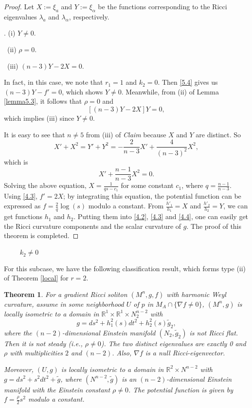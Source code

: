 \documentclass{amsart}
\newtheorem{theorem}{Theorem}[section]
\theoremstyle{definition}
\theoremstyle{remark}
\numberwithin{equation}{section}
\begin{document}
\begin{proof} 
	Let $X:=\xi_a$ and $Y:=\xi_\alpha$ be the functions corresponding to the Ricci eigenvalues 
	$\lambda_a$ and $\lambda_\alpha$, respectively.
	
.
	{\rm (i)} $Y\neq0$.
	
	\smallskip
\quad\quad \ {\rm (ii)} $\rho=0$.
	
	\smallskip
\quad\quad \ {\rm (iii)} $(n-3)Y-2X=0$. 
	
	In fact, in this case, we note that $r_1=1$ and $k_2=0$. Then \eqref {5.4} gives us
	$(n-3)Y-f'=0$, which shows $Y\neq0$.
Meanwhile, from (ii) of Lemma \ref{lemma5.3}, it follows that
	$\rho=0$ and 
\[
	[(n-3)Y-2X]Y= 0,
\]
	which implies (iii) since  $Y\neq0$.

	It is easy to see that $n\neq5$ from (iii) of {\it Claim} because $X$ and $Y$ are distinct.
	So
	\[
	X'+X^2=Y'+Y^2= -\frac{2}{n-3}X' +\frac{4}{(n-3)^2}X^2,
	\]
	which is 
	\[
	X'+\frac{n-1}{n-3}X^2=0. 
	\]
	Solving the above equation, 
	$X=\frac{1}{qs-c_1}$ for some constant $c_1$, where $q=\frac{n-1}{n-3}$.
	Using \eqref{4.3}, $f'=2X$; by integrating this equation,
	the potential function can be expressed as $f=\frac{2}{q} \log (s)$ modulo a constant.
	From $\frac{h'_1}{h_1}=X$ and $\frac{h'_2}{h_2}=Y$, we can get functions $h_1$ and $h_2$.
	Putting them into \eqref{4.2}, \eqref{4.3} and \eqref{4.4}, one can easily get the Ricci curvature components and the scalar curvature of $g$.  
	The proof of this theorem is completed. 	
\end{proof}


  ~~~~ $k_2\neq0$ 

For this subcase, we have the following classification result,
which forms type {\rm (ii)} of Theorem \ref{local} for $r=2$.
	
\begin{theorem} \label{twoone2}
		For a gradient Ricci soliton $\left(M^n, g, f \right) $ with harmonic Weyl curvature,
	assume in some neighborhood $U$ of $p$ in $M_A \cap \{ \nabla f \neq 0  \}$, 
	$(M^n,g)$ is locally isometric to a domain in 
	$\mathbb{R}^{1}\times \mathbb{R}^{1} \times N^{n-2}_2$
	with
	\[
	g= ds^2 + h^2_1(s)dt^2+h^2_2(s) \tilde{g}_{2}, 
	\]
	where the $(n-2)$-dimensional Einstein manifold $(N_2, \tilde{g}_{2})$ is not Ricci flat.
	Then it is not steady (i.e., $\rho\neq0$).  The two distinct eigenvalues are exactly  0 and $\rho$
	with multiplicities $2$ and $(n-2)$. Also, $\nabla f$ is a null Ricci-eigenvector.
	
	Moreover, $(U,g)$ is locally isometric to a domain in 
	$\mathbb{R}^{2}\times N^{n-2}$
	with $g= ds^2 + s^2dt^2+\tilde{g} $,
	where $\left(N^{n-2}, \tilde{g}\right)$ 
	is an $(n-2)$-dimensional Einstein manifold
	with the Einstein constant $\rho\neq 0$.
	The potential function is given by $f = \frac{\rho}{2}s^2$ modulo a constant.
\end{theorem}
\end{document}

